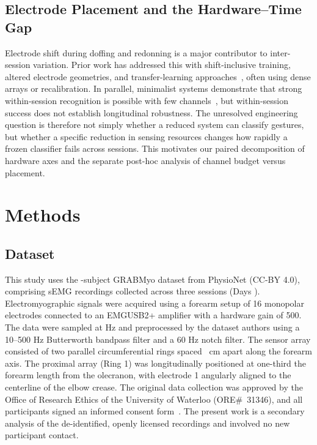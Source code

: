 \documentclass[preprint,12pt]{elsarticle}
\begin{document}
\subsection{Electrode Placement and the Hardware--Time Gap}
Electrode shift during doffing and redonning is a major contributor to inter-session variation. Prior work has addressed this with shift-inclusive training, altered electrode geometries, and transfer-learning approaches~\cite{HARGROVE2008175,5872014,8673876}, often using dense arrays or recalibration. In parallel, minimalist systems demonstrate that strong within-session recognition is possible with few channels~\cite{tavakoli2018doublechannel}, but within-session success does not establish longitudinal robustness. The unresolved engineering question is therefore not simply whether a reduced system can classify gestures, but whether a specific reduction in sensing resources changes how rapidly a frozen classifier fails across sessions. This motivates our paired decomposition of hardware axes and the separate post-hoc analysis of channel budget versus placement.

\section{Methods}
\subsection{Dataset}
This study uses the \nSubjects{}-subject GRABMyo dataset from PhysioNet (CC-BY 4.0), comprising sEMG recordings collected across three sessions (Days \sessionDays).
Electromyographic signals were acquired using a forearm setup of 16 monopolar electrodes connected to an EMGUSB2+ amplifier with a hardware gain of 500. The data were sampled at \fsClinical{} Hz and preprocessed by the dataset authors using a 10--500 Hz Butterworth bandpass filter and a 60 Hz notch filter. The sensor array consisted of two parallel circumferential rings spaced \interRingCm{}~cm apart along the forearm axis. The proximal array (Ring 1) was longitudinally positioned at one-third the forearm length from the olecranon, with electrode 1 angularly aligned to the centerline of the elbow crease. The original data collection was approved by the Office of Research Ethics of the University of Waterloo (ORE\#~31346), and all participants signed an informed consent form~\cite{pradhan2022grabmyo}. The present work is a secondary analysis of the de-identified, openly licensed recordings and involved no new participant contact.
\end{document}
